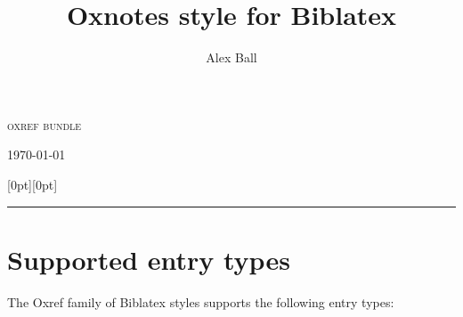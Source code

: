 \documentclass[extrafontsizes,11pt,a4paper,oneside]{memoir}
\title{Oxnotes style for Biblatex}
\author{Alex Ball}
\begin{document}
\thispagestyle{empty}
\begin{adjustwidth}{.2\textwidth}{0pt}
  \sffamily\setlength{\parindent}{0pt}%
  \LARGE\textsc{oxref bundle}
  
  \LARGE\thetitle
  
  \bigskip
  \Large\theauthor
  
  \bigskip
  \Large\ifx\undefined\thedate\today\else\thedate\fi
\end{adjustwidth}

\noindent
\hspace*{.1\textwidth}\raisebox{0pt}[0pt][0pt]{\rule{\normalrulethickness}{\textheight}}

\newpage
\tableofcontents*

\chapter{Supported entry types}

The Oxref family of Biblatex styles supports the following entry types:
\end{document}
